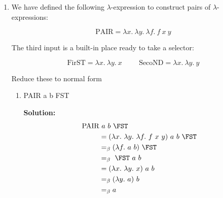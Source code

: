 \documentclass[11pt]{report}
\begin{document}
\begin{enumerate}
\begin{enumerate}
		{\bf Solution:}
			\begin{align*}
				\MULT &\ \TWO \ \THREE \\
				&= (\lambda m. \ \lambda n. \ \lambda u. \ \lambda v. \ m \ (n \ u) \ v) \ \TWO \ \THREE \\
				&\beq \lambda u. \ \lambda v. \ \TWO \ (\THREE \ u) \ v \\
				&= \lambda u. \ \lambda v. \ (\lambda s. \ \lambda x. \ s \ (s \ x)) \ (\THREE \ u) \ v \\
				&\beq \lambda u. \ \lambda v. \ (\THREE \ u) \ (\THREE \ u \ v)\\
				&= \lambda u. \ \lambda v. \ (\THREE \ u) \ ((\lambda s. \ \lambda x. \  s \ (s \ (s \ x))) \ u \ v)\\
				&\beq \lambda u. \ \lambda v. \ (\THREE \ u) \ (u \ (u \ (u \ v)))\\
				&= \lambda u. \ \lambda v. \ ((\lambda s. \ \lambda x. \  s \ (s \ (s \ x))) \ u) \ (u \ (u \ (u \ v)))\\
				&\beq \lambda u. \ \lambda v. \ (\lambda x. \  u \ (u \ (u \ x))) \ (u \ (u \ (u \ v)))\\
				&\beq \lambda u. \ \lambda v. \ u \ (u \ (u \ (u \ (u \ (u \ v)))))\\
				&\aeq \SIX
			\end{align*}

		
	\end{enumerate}
	
	\newpage
	\begin{center}
		{\bf Compound Data with PAIR}
	\end{center}

	\item We have defined the following $\lambda$-expression to construct pairs of $\lambda$-expressions:
	
	$$\text{PAIR} = \lambda x. \ \lambda y. \ \lambda f. \ f \ x \ y$$

	The third input is a built-in place ready to take a selector:

	$$\text{FirST} = \lambda x. \ \lambda y. \ x \hspace{1cm} \text{SecoND} = \lambda x. \ \lambda y. \ y$$

	 Reduce these to normal form 

		\begin{enumerate}
			\item PAIR a b FST 
			
			{\bf Solution:}
			\begin{align*}
				\PAIR &\ a \ b \ \FST \\
				&= (\lambda x. \ \lambda y. \ \lambda f. \ f \ x \ y) \ a \ b \ \FST \\
				&\beq (\lambda f. \ a \ b) \ \FST \\
				&\beq \ \FST \ a \ b \\
				&= (\lambda x. \ \lambda y. \ x) \ a \ b \\
				&\beq (\lambda y. \ a) \ b \\
				&\beq a
			\end{align*}


\end{enumerate}
\end{enumerate}
\end{document}
